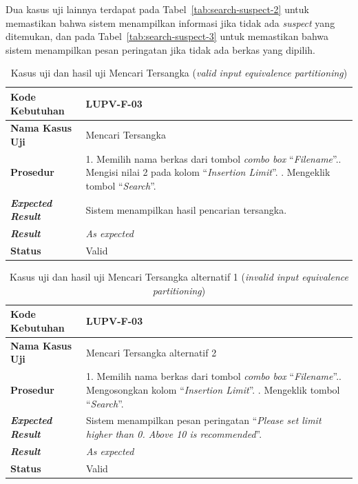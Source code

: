 Dua kasus uji lainnya terdapat pada Tabel~\ref{tab:search-suspect-2}
untuk memastikan bahwa sistem menampilkan informasi jika tidak ada
\emph{suspect} yang ditemukan, dan pada
Tabel~\ref{tab:search-suspect-3} untuk memastikan bahwa sistem
menampilkan pesan peringatan jika tidak ada berkas yang dipilih.

\begin{longtable}{|L{3cm}|L{9cm}|}
  \caption{Kasus uji dan hasil uji Mencari Tersangka (\emph{valid input
  equivalence partitioning})}\label{tab:search-suspect-ep-1} \\
  \hline
  \textbf{Kode Kebutuhan} & LUPV-F-03 \\\hline
  \textbf{Nama Kasus Uji} & Mencari Tersangka\\\hline
  \textbf{Prosedur} & 1. Memilih nama berkas dari tombol \emph{combo box}
                      ``\emph{Filename}''.. Mengisi nilai 2 pada kolom ``\emph{Insertion
                      Limit}''. . Mengeklik tombol ``\emph{Search}''.\\\hline
  \textbf{\emph{Expected Result}} & Sistem menampilkan hasil pencarian tersangka.\\\hline
  \textbf{\emph{Result}} & \emph{As expected} \\\hline
  \textbf{Status} & Valid\\\hline
\end{longtable}

\begin{longtable}{|L{3cm}|L{9cm}|}
  \caption{Kasus uji dan hasil uji Mencari Tersangka alternatif 1
  (\emph{invalid input equivalence partitioning})}\label{tab:search-suspect-ep-2} \\
  \hline
  \textbf{Kode Kebutuhan} & LUPV-F-03 \\\hline
  \textbf{Nama Kasus Uji} & Mencari Tersangka alternatif 2\\\hline
  \textbf{Prosedur} & 1. Memilih nama berkas dari tombol \emph{combo box}
                      ``\emph{Filename}''.. Mengosongkan  kolom ``\emph{Insertion
                      Limit}''. . Mengeklik tombol ``\emph{Search}''.\\\hline

  \textbf{\emph{Expected Result}} & Sistem menampilkan pesan peringatan ``\emph{Please set limit
                                    higher than 0. Above 10 is recommended}''.\\\hline
  \textbf{\emph{Result}} & \emph{As expected} \\\hline
  \textbf{Status} & Valid\\\hline
\end{longtable}

